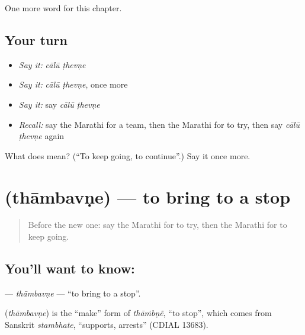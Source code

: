 \begin{grammarlens}[title={What you've built}]
One more word for this chapter.
\end{grammarlens}

\subsection*{Your turn}
\begin{itemize}
\raggedright
  \item \emph{Say it:} \emph{cālū ṭhevṇe}
  \item \emph{Say it:} \emph{cālū ṭhevṇe}, once more
  \item \emph{Say it:} say \emph{cālū ṭhevṇe}
  \item \emph{Recall:} say the Marathi for a team, then the Marathi for to try, then say \emph{cālū ṭhevṇe} again
\end{itemize}

\begin{tcolorbox}[breakable,colback=teal!4,colframe=teal!35!black,title={Before you move on}]
What does   mean? (\textquotedblleft{}To keep going, to continue\textquotedblright{}.) Say it once more.
\end{tcolorbox}
\section[\texorpdfstring{\mr{थांबवणे} (thāmbavṇe)}{थांबवणे (thāmbavṇe)}]{ (thāmbavṇe) — to bring to a stop}

\label{lesson:MR-C251-thambavne}



\begin{quote}
Before the new one: say the Marathi for to try, then the Marathi for to keep going.
\end{quote}

\subsection*{You'll want to know: }
\textbf{} — \emph{thāmbavṇe} — \textquotedblleft{}to bring to a stop\textquotedblright{}.

\begin{cousinweb}
\textbf{} (\emph{thāmbavṇe}) is the \textquotedblleft{}make\textquotedblright{} form of \emph{thāṁbṇẽ}, \textquotedblleft{}to stop\textquotedblright{}, which comes from Sanskrit \emph{stambhate}, \textquotedblleft{}supports, arrests\textquotedblright{} (CDIAL 13683).
\end{cousinweb}

